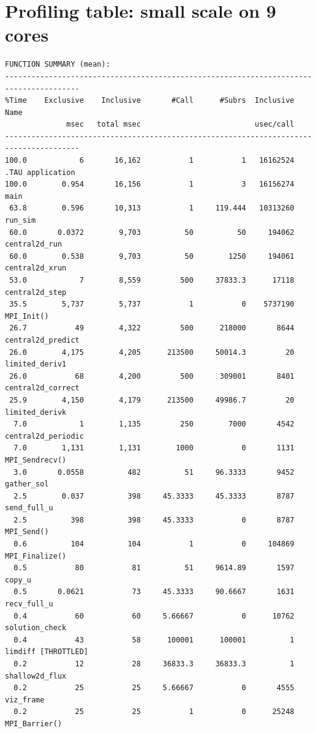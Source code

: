 \documentclass{article}
\begin{document}
\appendix
\section{Profiling table: small scale on 9 cores}
\noindent
{\footnotesize
\begin{verbatim}
FUNCTION SUMMARY (mean):
---------------------------------------------------------------------------------------
%Time    Exclusive    Inclusive       #Call      #Subrs  Inclusive Name
              msec   total msec                          usec/call 
---------------------------------------------------------------------------------------
100.0            6       16,162           1           1   16162524 .TAU application
100.0        0.954       16,156           1           3   16156274 main 
 63.8        0.596       10,313           1     119.444   10313260 run_sim 
 60.0       0.0372        9,703          50          50     194062 central2d_run 
 60.0        0.538        9,703          50        1250     194061 central2d_xrun 
 53.0            7        8,559         500     37833.3      17118 central2d_step 
 35.5        5,737        5,737           1           0    5737190 MPI_Init() 
 26.7           49        4,322         500      218000       8644 central2d_predict 
 26.0        4,175        4,205      213500     50014.3         20 limited_deriv1 
 26.0           68        4,200         500      309001       8401 central2d_correct 
 25.9        4,150        4,179      213500     49986.7         20 limited_derivk 
  7.0            1        1,135         250        7000       4542 central2d_periodic 
  7.0        1,131        1,131        1000           0       1131 MPI_Sendrecv() 
  3.0       0.0558          482          51     96.3333       9452 gather_sol 
  2.5        0.037          398     45.3333     45.3333       8787 send_full_u 
  2.5          398          398     45.3333           0       8787 MPI_Send() 
  0.6          104          104           1           0     104869 MPI_Finalize() 
  0.5           80           81          51     9614.89       1597 copy_u 
  0.5       0.0621           73     45.3333     90.6667       1631 recv_full_u 
  0.4           60           60     5.66667           0      10762 solution_check 
  0.4           43           58      100001      100001          1 limdiff [THROTTLED]
  0.2           12           28     36833.3     36833.3          1 shallow2d_flux 
  0.2           25           25     5.66667           0       4555 viz_frame 
  0.2           25           25           1           0      25248 MPI_Barrier() 

\end{verbatim}}
\end{document}
